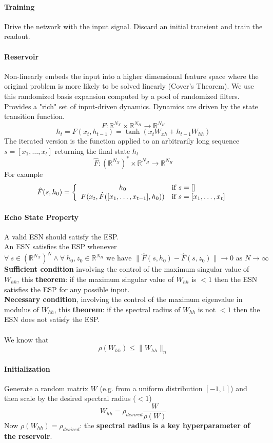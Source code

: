 \documentclass[10pt]{report}
\begin{document}
\paragraph{Training} Drive the network with the input signal. Discard an initial transient and train the readout.
\paragraph{Reservoir} Non-linearly embeds the input into a higher dimensional feature space where the original problem is more likely to be solved linearly (Cover's Theorem). We use this randomized basis expansion computed by a pool of randomized filters. Provides a "rich" set of input-driven dynamics. Dynamics are driven by the state transition function.
$$F:\mathbb{R}^{N_X}\times \mathbb{R}^{N_H}\rightarrow \mathbb{R}^{N_H}$$
$$h_t = F(x_t, h_{t-1}) = \tanh(x_tW_{xh} + h_{t-1}W_{hh})$$
The iterated version is the function applied to an arbitrarily long sequence $s = [x_1,\ldots,x_t]$ returning the final state $h_t$
$$\hat{F}:(\mathbb{R}^{N_X})^*\times \mathbb{R}^{N_H}\rightarrow \mathbb{R}^{N_H}$$
For example $$\hat{F}(s,h_0)=\left\{\begin{array}{c l}
h_0&\text{if }s=[]\\
F(x_t,\hat{F}([x_1,\ldots,x_{t-1}],h_0))&\text{if }s=[x_1,\ldots,x_t]
\end{array}\right.$$
\paragraph{Echo State Property} A valid ESN should satisfy the ESP.\\
An ESN satisfies the ESP whenever
$$\forall\:s\in (\mathbb{R}^{N_X})^N \wedge \forall\:h_0,z_0\in\mathbb{R}^{N_H}\text{ we have }\|\hat{F}(s, h_0)-\hat{F}(s,z_0)\|\rightarrow 0\text{ as }N\rightarrow\infty$$
\textbf{Sufficient condition} involving the control of the maximum singular value of $W_{hh}$, this \textbf{theorem}: if the maximum singular value of $W_{hh}$ is $< 1$ then the ESN satisfies the ESP for any possible input.\\
\textbf{Necessary condition}, involving the control of the maximum eigenvalue in modulus of $W_{hh}$, this \textbf{theorem}: if the spectral radius of $W_{hh}$ is not $< 1$ then the ESN does not satisfy the ESP.\\\\
We know that $$\rho(W_{hh})\leq \|W_{hh}\|_n$$
\paragraph{Initialization} Generate a random matrix $W$ (e.g. from a uniform distribution $[-1,1]$) and then scale by the desired spectral radius ($<1$) $$W_{hh} =\rho_{desired}\frac{W}{\rho(W)}$$
Now $\rho(W_{hh}) = \rho_{desired}$: the \textbf{spectral radius is a key hyperparameter of the reservoir}.
\end{document}
